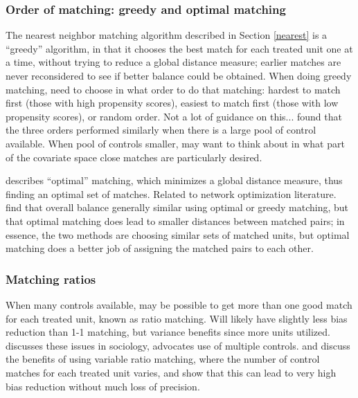 \documentclass[11pt,titlepage]{article}
\begin{document}
\subsubsection{Order of matching: greedy and optimal matching}
The nearest neighbor matching algorithm described in Section \ref{nearest} is a ``greedy'' algorithm, in that it chooses the best match for each treated unit one 
at a time, without trying to reduce a global distance measure; earlier matches are never reconsidered to see if better balance could be obtained.
When doing greedy matching, need to choose in what order to do that matching: hardest to match first (those with high propensity scores), easiest to match first
(those with low propensity scores), or random order.  Not a lot of guidance on this...\cite{Rubin73a} found that the three orders performed similarly
when there is a large pool of control available.  When pool of controls smaller, may want to think about in what part of the covariate space close matches
are particularly desired.  

\cite{Rosenbaum02} describes ``optimal'' matching, which minimizes a global distance measure, thus finding an optimal set of matches.  Related to network optimization 
literature.
\cite{GuRos93} find that overall balance generally similar using optimal or greedy matching, but that optimal matching does lead to smaller distances between matched pairs;
in essence, the two methods are choosing similar sets of matched units, but optimal matching does a better job of assigning the matched pairs to each other.  

\subsubsection{Matching ratios}
When many controls available, may be possible to get more than one good match for each treated unit, known as ratio matching.  Will likely have slightly less bias
reduction than 1-1 matching, but variance benefits since more units utilized.  \cite{Smith97} discusses these issues in sociology, advocates use of multiple controls.  
\cite{Rosenbaum91a} and \cite{MinRos00} discuss the benefits of using variable ratio matching, where the number of control matches for each treated unit varies, and
show that this can lead to very high bias reduction without much loss of precision.
\end{document}
